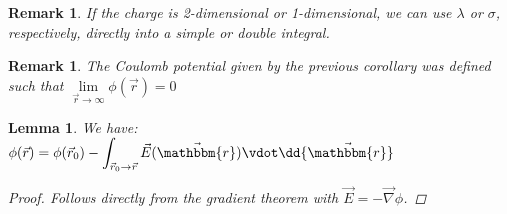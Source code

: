 \documentclass[12pt]{article}
\renewcommand{\grad}{\vec{\nabla}}
\newcommand*{\rv}{\vec{r}}
\newcommand*{\irv}{\vec{\mathbbm{r}}}
\newcommand*{\vE}{\vec{E}}
\newtheorem{lemma}[theorem]{Lemma}
\newtheorem{remark}[theorem]{Remark}
\begin{document}
\begin{remark}
  If the charge is 2-dimensional or 1-dimensional, we can use $\lambda$ or $\sigma$, respectively, directly into a simple or double integral.
\end{remark}

\begin{remark}
  The Coulomb potential given by the previous corollary was defined such that $\lim\limits_{\rv\to\infty}\phi(\rv)=0$
\end{remark}

\begin{lemma}
  \label{potential_integral}
  We have: $\displaystyle\phi(\rv)=\phi(\rv_0)-\int_{\rv_0\to\rv}\vE(\irv)\vdot\dd{\irv}$
  \begin{proof}
    Follows directly from the gradient theorem with $\vE=-\grad\phi$.
  \end{proof}
\end{lemma}
\end{document}
